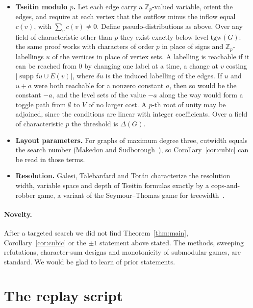 \documentclass[11pt]{article}
\theoremstyle{definition}
\theoremstyle{remark}
\newcommand{\tgw}{\mathrm{tgw}}
\newcommand{\cw}{\mathrm{cw}}
\begin{document}
\begin{itemize}
$4$ while $\cw=5$. So Nullstellensatz needs degree $6$ there, while
Sherali--Adams refutes at degree $5$.
\item \textbf{Tseitin modulo $p$.} Let each edge carry a $\mathbb
Z_p$-valued variable, orient the edges, and require at each vertex that the
outflow minus the inflow equal $c(v)$, with $\sum_vc(v)\ne0$. Define
pseudo-distributions as above. Over any field of characteristic other than $p$
they exist exactly below level $\tgw(G)$: the same proof works with characters
of order $p$ in place of signs and $\mathbb Z_p$-labellings $u$ of the vertices
in place of vertex sets. A labelling is reachable if it can be reached from $0$
by changing one label at a time, a change at $v$ costing
$|\operatorname{supp}\delta u\cup E(v)|$, where $\delta u$ is the induced
labelling of the edges. If $u$ and $u+a$ were both reachable for a nonzero
constant $a$, then so would be the constant $-a$, and the level sets of the
value $-a$ along the way would form a toggle path from $\emptyset$ to $V$ of no
larger cost. A $p$-th root of unity may be adjoined, since the
conditions are linear with integer coefficients. Over a field of
characteristic $p$ the threshold is $\Delta(G)$.
\item \textbf{Layout parameters.} For graphs of maximum degree three,
cutwidth equals the search number (Makedon and Sudborough~\cite{MS89}), so
Corollary~\ref{cor:cubic} can be read in those terms.
\item \textbf{Resolution.} Galesi, Talebanfard and Tor\'an characterize the
resolution width, variable space and depth of Tseitin formulas exactly by a
cops-and-robber game, a variant of the Seymour--Thomas game for
treewidth~\cite{GTT20}.
\end{itemize}

\paragraph{Novelty.} After a targeted search we did not find
Theorem~\ref{thm:main}, Corollary~\ref{cor:cubic} or the $\pm1$ statement above
stated. The methods,
sweeping refutations, character-sum designs and monotonicity of submodular
games, are standard. We would be glad to learn of prior statements.

\section{The replay script}
\end{document}
